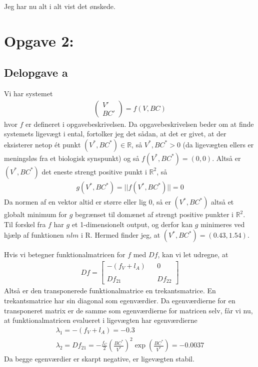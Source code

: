 \documentclass[12pt]{article}
\begin{document}
Jeg har nu alt i alt vist det ønskede.

\section{Opgave 2: }

\subsection{Delopgave a}

Vi har systemet 
\begin{align}
\begin{pmatrix}
V' \\ BC' 
\end{pmatrix} = f(V, BC)
\end{align}
hvor $f$ er defineret i opgavebeskrivelsen. Da opgavebeskrivelsen beder om at finde systemets ligevægt i ental, fortolker jeg det sådan, at det er givet, at der eksisterer netop ét punkt $(V^*,BC^*)\in \mathbb{R}$, så $V^*, BC^*>0$ (da ligevægten ellers er meningsløs fra et biologisk synspunkt) og så $f(V^*, BC^*) = (0,0)$. Altså er $(V^*, BC^*)$ det eneste strengt positive punkt i $\mathbb{R}^2$, så
\begin{align}
g(V^*, BC^*) = ||f(V^*, BC^*)|| = 0
\end{align}
Da normen af en vektor altid er større eller lig 0, så er $(V^*, BC^*)$ altså et globalt minimum for $g$ begrænset til domænet af strengt positive punkter i $\mathbb{R}^2$. Til forskel fra $f$ har $g$ et 1-dimensionelt output, og derfor kan $g$ minimeres ved hjælp af funktionen $nlm$ i R. Hermed finder jeg, at $(V^*, BC^*) = (0.43, 1.54)$.

Hvis vi betegner funktionalmatricen for $f$ med $Df$, kan vi let udregne, at 
\begin{align}
Df = \begin{bmatrix}
-(f_V + l_A) && 0 \\ \\
Df_{21} && Df_{22}
\end{bmatrix}
\end{align}
Altså er den transponerede funktionalmatrice en trekantsmatrice. En trekantsmatrice har sin diagonal som egenværdier. Da egenværdierne for en transponeret matrix er de samme som egenværdierne for matricen selv, får vi nu, at funktionalmatricen evalueret i ligevægten har egenværdierne
\begin{align}
\lambda_1 = -(f_V + l_A) = -0.3\\
\lambda_2 = Df_{21} = -\frac{f_C}{2}\left(\frac{BC^*}{V^*}\right)^2 \exp\left( \frac{BC^*}{V^*}\right) = -0.0037
\end{align}
Da begge egenværdier er skarpt negative, er ligevægten stabil.
\end{document}
